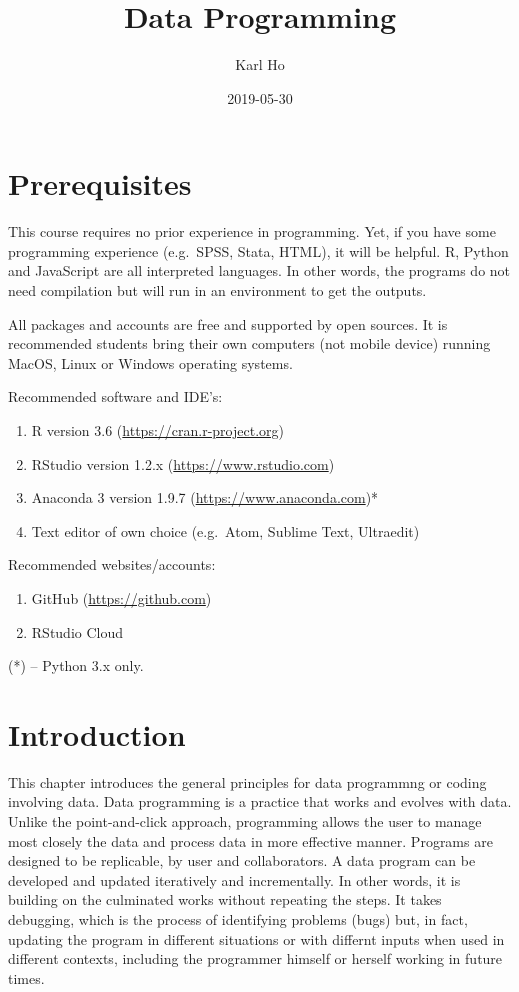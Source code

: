 \documentclass[]{book}
\title{Data Programming}
\author{Karl Ho}
\date{2019-05-30}
\providecommand{\tightlist}{%
  \setlength{\itemsep}{0pt}\setlength{\parskip}{0pt}}
\begin{document}
\maketitle

{
\setcounter{tocdepth}{1}
\tableofcontents
}
\hypertarget{prerequisites}{%
\chapter{Prerequisites}\label{prerequisites}}

This course requires no prior experience in programming. Yet, if you have some programming experience (e.g.~SPSS, Stata, HTML), it will be helpful. R, Python and JavaScript are all interpreted languages. In other words, the programs do not need compilation but will run in an environment to get the outputs.

All packages and accounts are free and supported by open sources. It is recommended students bring their own computers (not mobile device) running MacOS, Linux or Windows operating systems.

Recommended software and IDE's:

\begin{enumerate}
\def\labelenumi{\arabic{enumi}.}
\tightlist
\item
  R version 3.6 (\url{https://cran.r-project.org})
\item
  RStudio version 1.2.x (\url{https://www.rstudio.com})
\item
  Anaconda 3 version 1.9.7 (\url{https://www.anaconda.com})*
\item
  Text editor of own choice (e.g.~Atom, Sublime Text, Ultraedit)
\end{enumerate}

Recommended websites/accounts:

\begin{enumerate}
\def\labelenumi{\arabic{enumi}.}
\tightlist
\item
  GitHub (\url{https://github.com})
\item
  RStudio Cloud
\end{enumerate}

(*) -- Python 3.x only.

\hypertarget{intro}{%
\chapter{Introduction}\label{intro}}

This chapter introduces the general principles for data programmng or coding involving data. Data programming is a practice that works and evolves with data. Unlike the point-and-click approach, programming allows the user to manage most closely the data and process data in more effective manner. Programs are designed to be replicable, by user and collaborators. A data program can be developed and updated iteratively and incrementally. In other words, it is building on the culminated works without repeating the steps. It takes debugging, which is the process of identifying problems (bugs) but, in fact, updating the program in different situations or with differnt inputs when used in different contexts, including the programmer himself or herself working in future times.
\end{document}
